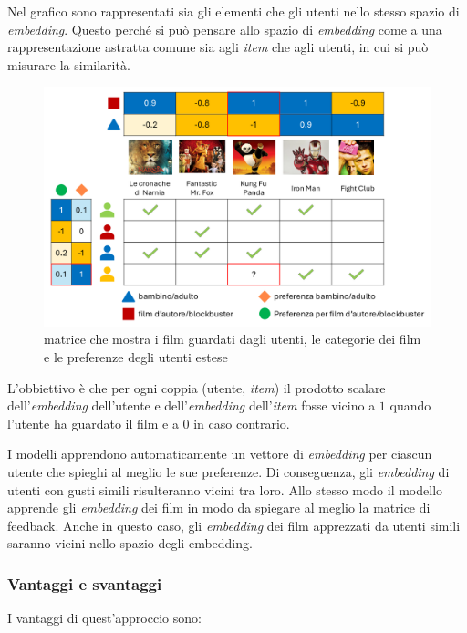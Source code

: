 Nel grafico sono rappresentati sia gli elementi che gli utenti nello stesso spazio di \textit{embedding}. Questo perché si può pensare allo spazio di \textit{embedding} come a una rappresentazione astratta comune sia agli \textit{item} che agli utenti, in cui si può misurare la similarità.

\begin{figure}[H]
    \centering
    \includegraphics[scale=0.4]{figures/collaborative_filtering/2D_matrix.PNG}
    \caption{matrice che mostra i film guardati dagli utenti, le categorie dei film e le preferenze degli utenti estese}
    \label{fig:2D_matrix}
\end{figure}

L'obbiettivo è che per ogni coppia (utente, \textit{item}) il prodotto scalare dell'\textit{embedding} dell'utente e dell'\textit{embedding} dell'\textit{item} fosse vicino a $1$ quando l'utente ha guardato il film e a $0$ in caso contrario.

I modelli apprendono automaticamente un vettore di \textit{embedding} per ciascun utente che spieghi al meglio le sue preferenze. Di conseguenza, gli \textit{embedding} di utenti con gusti simili risulteranno vicini tra loro. Allo stesso modo il modello apprende gli \textit{embedding} dei film in modo da spiegare al meglio la matrice di feedback. Anche in questo caso, gli \textit{embedding} dei film apprezzati da utenti simili saranno vicini nello spazio degli embedding.

\subsubsection{Vantaggi e svantaggi}

I vantaggi di quest'approccio sono:

